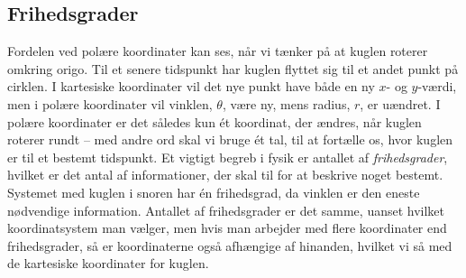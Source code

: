 \subsection{Frihedsgrader}
Fordelen ved polære koordinater kan ses, når vi tænker på at kuglen roterer omkring origo. Til et senere tidspunkt har kuglen flyttet sig til et andet punkt på cirklen. I kartesiske koordinater vil det nye punkt have både en ny $x$- og $y$-værdi, men i polære koordinater vil vinklen, $\theta$, være ny, mens radius, $r$, er uændret. I polære koordinater er det således kun ét koordinat, der ændres, når kuglen roterer rundt -- med andre ord skal vi bruge ét tal, til at fortælle os, hvor kuglen er til et bestemt tidspunkt. Et vigtigt begreb i fysik er antallet af \textit{frihedsgrader}, hvilket er det antal af informationer, der skal til for at beskrive noget bestemt. Systemet med kuglen i snoren har én frihedsgrad, da vinklen er den eneste nødvendige information. Antallet af frihedsgrader er det samme, uanset hvilket koordinatsystem man vælger, men hvis man arbejder med flere koordinater end frihedsgrader, så er koordinaterne også afhængige af hinanden, hvilket vi så med de kartesiske koordinater for kuglen.%

